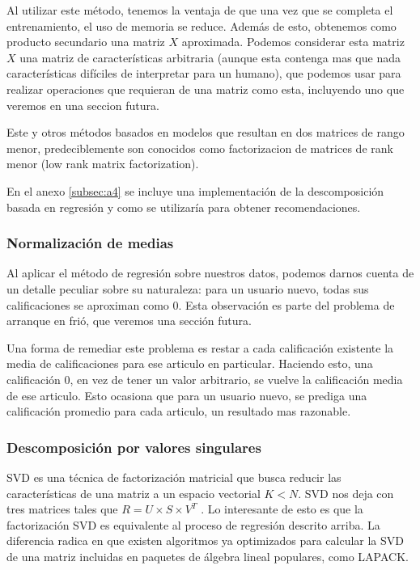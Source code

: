 \documentclass[11pt]{article}
\begin{document}
Al utilizar este método, tenemos la ventaja de que una vez que se completa el
entrenamiento, el uso de memoria se reduce. Además de esto, obtenemos como
producto secundario una matriz $X$ aproximada. Podemos considerar esta matriz
$X$ una matriz de características arbitraria (aunque esta contenga mas que nada
características difíciles de interpretar para un humano), que podemos usar para
realizar operaciones que requieran de una matriz como esta, incluyendo uno que
veremos en una seccion futura.

Este y otros métodos basados en modelos que resultan en dos matrices de rango
menor, predeciblemente son conocidos como factorizacion de matrices de rank
menor (low rank matrix factorization).

En el anexo \ref{subsec:a4} se incluye una implementación de la descomposición
basada en regresión y como se utilizaría para obtener recomendaciones.

\subsubsection{Normalización de medias}

Al aplicar el método de regresión sobre nuestros datos, podemos darnos cuenta de
un detalle peculiar sobre su naturaleza: para un usuario nuevo, todas sus
calificaciones se aproximan como 0. Esta observación es parte del problema de
arranque en frió, que veremos una sección futura.

Una forma de remediar este problema es restar a cada calificación existente la
media de calificaciones para ese articulo en particular. Haciendo esto, una
calificación 0, en vez de tener un valor arbitrario, se vuelve la calificación
media de ese articulo. Esto ocasiona que para un usuario nuevo, se prediga una
calificación promedio para cada articulo, un resultado mas razonable.

\subsubsection{Descomposición por valores singulares}

SVD es una técnica de factorización matricial que busca reducir las
características de una matriz a un espacio vectorial $K < N$. SVD nos deja con
tres matrices tales que $R = U×S×V^T$ \cite{svd}. Lo interesante de esto es que la
factorización SVD es equivalente al proceso de regresión descrito arriba.
La diferencia radica en que existen algoritmos ya optimizados para calcular la
SVD de una matriz incluidas en paquetes de álgebra lineal populares, como
LAPACK.
\end{document}
